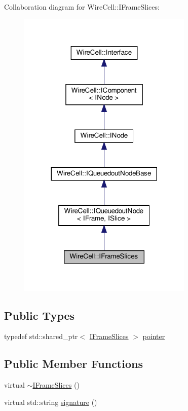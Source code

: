 Collaboration diagram for Wire\+Cell\+:\+:I\+Frame\+Slices\+:
\nopagebreak
\begin{figure}[H]
\begin{center}
\leavevmode
\includegraphics[width=236pt]{class_wire_cell_1_1_i_frame_slices__coll__graph}
\end{center}
\end{figure}
\subsection*{Public Types}
\begin{DoxyCompactItemize}
\item 
typedef std\+::shared\+\_\+ptr$<$ \hyperlink{class_wire_cell_1_1_i_frame_slices}{I\+Frame\+Slices} $>$ \hyperlink{class_wire_cell_1_1_i_frame_slices_a07b3528664286368bde54d2db79064e1}{pointer}
\end{DoxyCompactItemize}
\subsection*{Public Member Functions}
\begin{DoxyCompactItemize}
\item 
virtual \hyperlink{class_wire_cell_1_1_i_frame_slices_a12596b1638a6a03c13433165d22bb716}{$\sim$\+I\+Frame\+Slices} ()
\item 
virtual std\+::string \hyperlink{class_wire_cell_1_1_i_frame_slices_acd57c74cab5f5a7ec99fdd89f2bfdb50}{signature} ()
\end{DoxyCompactItemize}



